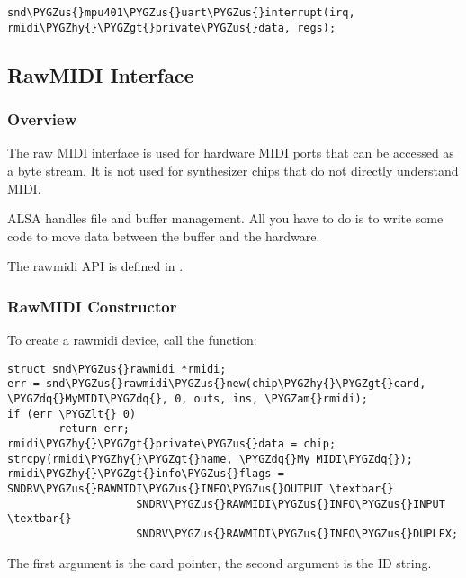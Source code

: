 \documentclass[a4paper,8pt,english]{sphinxmanual}
\def\PYGZus{\char`\_}
\def\PYGZam{\char`\&}
\def\PYGZlt{\char`\<}
\def\PYGZgt{\char`\>}
\def\PYGZhy{\char`\-}
\def\PYGZdq{\char`\"}
\begin{document}
\begin{Verbatim}[commandchars=\\\{\}]
snd\PYGZus{}mpu401\PYGZus{}uart\PYGZus{}interrupt(irq, rmidi\PYGZhy{}\PYGZgt{}private\PYGZus{}data, regs);
\end{Verbatim}


\subsection{RawMIDI Interface}
\label{sound/kernel-api/writing-an-alsa-driver:rawmidi-interface}

\subsubsection{Overview}
\label{sound/kernel-api/writing-an-alsa-driver:overview}
The raw MIDI interface is used for hardware MIDI ports that can be
accessed as a byte stream. It is not used for synthesizer chips that do
not directly understand MIDI.

ALSA handles file and buffer management. All you have to do is to write
some code to move data between the buffer and the hardware.

The rawmidi API is defined in .


\subsubsection{RawMIDI Constructor}
\label{sound/kernel-api/writing-an-alsa-driver:rawmidi-constructor}
To create a rawmidi device, call the 
function:

\begin{Verbatim}[commandchars=\\\{\}]
struct snd\PYGZus{}rawmidi *rmidi;
err = snd\PYGZus{}rawmidi\PYGZus{}new(chip\PYGZhy{}\PYGZgt{}card, \PYGZdq{}MyMIDI\PYGZdq{}, 0, outs, ins, \PYGZam{}rmidi);
if (err \PYGZlt{} 0)
        return err;
rmidi\PYGZhy{}\PYGZgt{}private\PYGZus{}data = chip;
strcpy(rmidi\PYGZhy{}\PYGZgt{}name, \PYGZdq{}My MIDI\PYGZdq{});
rmidi\PYGZhy{}\PYGZgt{}info\PYGZus{}flags = SNDRV\PYGZus{}RAWMIDI\PYGZus{}INFO\PYGZus{}OUTPUT \textbar{}
                    SNDRV\PYGZus{}RAWMIDI\PYGZus{}INFO\PYGZus{}INPUT \textbar{}
                    SNDRV\PYGZus{}RAWMIDI\PYGZus{}INFO\PYGZus{}DUPLEX;
\end{Verbatim}

The first argument is the card pointer, the second argument is the ID
string.
\end{document}
